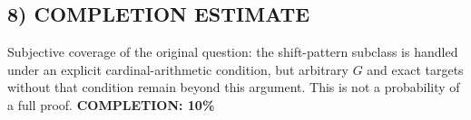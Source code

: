 \subsection*{8) COMPLETION ESTIMATE}
Subjective coverage of the original question: the shift-pattern subclass is handled under an explicit cardinal-arithmetic condition, but arbitrary $G$ and exact targets without that condition remain beyond this argument. This is not a probability of a full proof.
\textbf{COMPLETION: 10\%}
